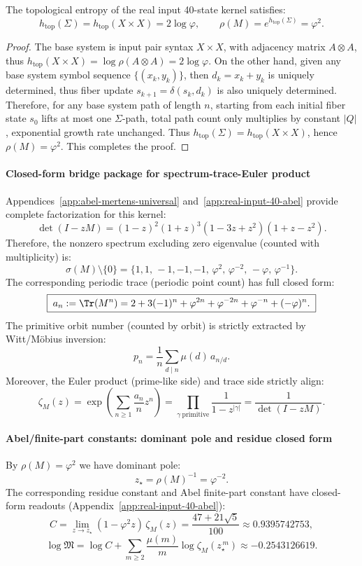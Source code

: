 \begin{proposition}[Deterministic extension does not increase entropy: $\rho(M)=\varphi^2$]\label{prop:real-input-40-entropy}
The topological entropy of the real input 40-state kernel satisfies:
\[
h_{\mathrm{top}}(\Sigma)=h_{\mathrm{top}}(X\times X)=2\log\varphi,
\qquad
\rho(M)=e^{h_{\mathrm{top}}(\Sigma)}=\varphi^2.
\]
\end{proposition}
\begin{proof}
The base system is input pair syntax $X\times X$, with adjacency matrix $A\otimes A$, thus $h_{\mathrm{top}}(X\times X)=\log\rho(A\otimes A)=2\log\varphi$.
On the other hand, given any base system symbol sequence $\{(x_k,y_k)\}$, then $d_k=x_k+y_k$ is uniquely determined, thus fiber update $s_{k+1}=\delta(s_k,d_k)$ is also uniquely determined.
Therefore, for any base system path of length $n$, starting from each initial fiber state $s_0$ lifts at most one $\Sigma$-path, total path count only multiplies by constant $|Q|$, exponential growth rate unchanged.
Thus $h_{\mathrm{top}}(\Sigma)=h_{\mathrm{top}}(X\times X)$, hence $\rho(M)=\varphi^2$. This completes the proof.
\end{proof}

\paragraph{Closed-form bridge package for spectrum-trace-Euler product}
Appendices~\ref{app:abel-mertens-universal} and~\ref{app:real-input-40-abel} provide complete factorization for this kernel:
\[
\boxed{\;
\det(I-zM)=(1-z)^2(1+z)^3(1-3z+z^2)(1+z-z^2).\;}
\]
Therefore, the nonzero spectrum excluding zero eigenvalue (counted with multiplicity) is:
\[
\sigma(M)\setminus\{0\}=\{1,1,\,-1,-1,-1,\,\varphi^2,\,\varphi^{-2},\,-\varphi,\,\varphi^{-1}\}.
\]
The corresponding periodic trace (periodic point count) has full closed form:
\[
\boxed{\;
a_n:=\Tr(M^n)=
2+3(-1)^n+\varphi^{2n}+\varphi^{-2n}+\varphi^{-n}+(-\varphi)^n.\;}
\]
The primitive orbit number (counted by orbit) is strictly extracted by Witt/Möbius inversion:
\[
\boxed{\;
p_n=\frac1n\sum_{d\mid n}\mu(d)\,a_{n/d}.\;}
\]
Moreover, the Euler product (prime-like side) and trace side strictly align:
\[
\zeta_M(z)
=\exp\!\left(\sum_{n\ge 1}\frac{a_n}{n}z^n\right)
=\prod_{\gamma\ \mathrm{primitive}}\frac{1}{1-z^{|\gamma|}}
=\frac{1}{\det(I-zM)}.
\]

\paragraph{Abel/finite-part constants: dominant pole and residue closed form}
By $\rho(M)=\varphi^2$ we have dominant pole:
\[
z_\star=\rho(M)^{-1}=\varphi^{-2}.
\]
The corresponding residue constant and Abel finite-part constant have closed-form readouts (Appendix~\ref{app:real-input-40-abel}):
\[
\boxed{\;
C=\lim_{z\to z_\star}(1-\varphi^2 z)\,\zeta_M(z)=\frac{47+21\sqrt5}{100}\approx 0.9395742753,\;}
\]
\[
\boxed{\;
\log\mathfrak{M}=\log C+\sum_{m\ge 2}\frac{\mu(m)}{m}\log\zeta_M(z_\star^{\,m})
\approx -0.2543126619.\;}
\]

